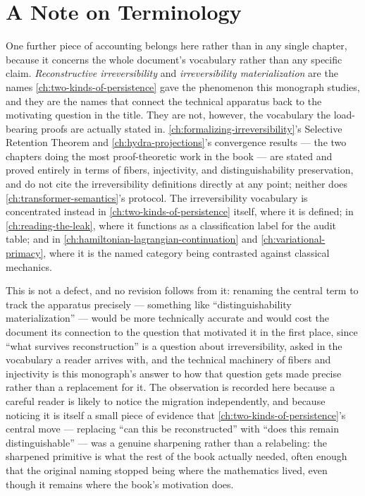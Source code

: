 \documentclass[11pt]{book}
\theoremstyle{plain}
\theoremstyle{definition}
\theoremstyle{remark}
\begin{document}
\section{A Note on Terminology}
\label{sec:terminology-migration}

One further piece of accounting belongs here rather than in any single
chapter, because it concerns the whole document's vocabulary rather
than any specific claim. \emph{Reconstructive irreversibility} and
\emph{irreversibility materialization} are the names
\cref{ch:two-kinds-of-persistence} gave the phenomenon this monograph
studies, and they are the names that connect the technical apparatus
back to the motivating question in the title. They are not, however,
the vocabulary the load-bearing proofs are actually stated in.
\cref{ch:formalizing-irreversibility}'s Selective Retention Theorem
and \cref{ch:hydra-projections}'s convergence results --- the two
chapters doing the most proof-theoretic work in the book --- are
stated and proved entirely in terms of fibers, injectivity, and
distinguishability preservation, and do not cite the irreversibility
definitions directly at any point; neither does
\cref{ch:transformer-semantics}'s protocol. The irreversibility
vocabulary is concentrated instead in \cref{ch:two-kinds-of-persistence}
itself, where it is defined; in \cref{ch:reading-the-leak}, where it
functions as a classification label for the audit table; and in
\cref{ch:hamiltonian-lagrangian-continuation} and
\cref{ch:variational-primacy}, where it is the named category being
contrasted against classical mechanics.

This is not a defect, and no revision follows from it: renaming the
central term to track the apparatus precisely --- something like
\enquote{distinguishability materialization} --- would be more
technically accurate and would cost the document its connection to the
question that motivated it in the first place, since \enquote{what
survives reconstruction} is a question about irreversibility, asked in
the vocabulary a reader arrives with, and the technical machinery of
fibers and injectivity is this monograph's answer to how that question
gets made precise rather than a replacement for it. The observation is
recorded here because a careful reader is likely to notice the
migration independently, and because noticing it is itself a small
piece of evidence that \cref{ch:two-kinds-of-persistence}'s central
move --- replacing \enquote{can this be reconstructed} with
\enquote{does this remain distinguishable} --- was a genuine
sharpening rather than a relabeling: the sharpened primitive is what
the rest of the book actually needed, often enough that the original
naming stopped being where the mathematics lived, even though it
remains where the book's motivation does.
\end{document}
